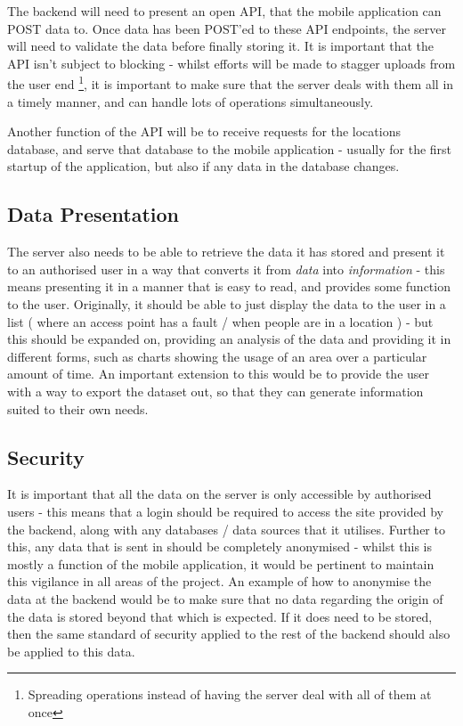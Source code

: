 \documentclass[11pt]{informatics-report}
\begin{document}
The backend will need to present an open API, that the mobile application can POST data to. Once data has been POST'ed to these API endpoints, the server will need to validate the data before finally storing it. It is important that the API isn't subject to blocking - whilst efforts will be made to stagger uploads from the user end \footnote{Spreading operations instead of having the server deal with all of them at once}, it is important to make sure that the server deals with them all in a timely manner, and can handle lots of operations simultaneously.

Another function of the API will be to receive requests for the locations database, and serve that database to the mobile application - usually for the first startup of the application, but also if any data in the database changes.  

\subsection{Data Presentation}

The server also needs to be able to retrieve the data it has stored and present it to an authorised user in a way that converts it from \textit{data} into \textit{information} - this means presenting it in a manner that is easy to read, and provides some function to the user. Originally, it should be able to just display the data to the user in a list ( where an access point has a fault / when people are in a location ) - but this should be expanded on, providing an analysis of the data and providing it in different forms, such as charts showing the usage of an area over a particular amount of time. An important extension to this would be to provide the user with a way to export the dataset out, so that they can generate information suited to their own needs.

\subsection{Security}

It is important that all the data on the server is only accessible by authorised users - this means that a login should be required to access the site provided by the backend, along with any databases / data sources that it utilises. Further to this, any data that is sent in should be completely anonymised - whilst this is mostly a function of the mobile application, it would be pertinent to maintain this vigilance in all areas of the project. An example of how to anonymise the data at the backend would be to make sure that no data regarding the origin of the data is stored beyond that which is expected. If it does need to be stored, then the same standard of security applied to the rest of the backend should also be applied to this data.
\end{document}
